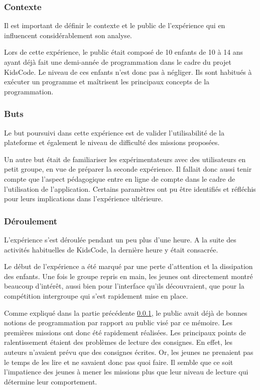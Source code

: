 \subsubsection{Contexte}
\label{context-kidscode}
Il est important de définir le contexte et le public de l'expérience qui en influencent considérablement son analyse.

Lors de cette expérience, le public était composé de 10 enfants de 10 à 14 ans ayant déjà fait une demi-année de programmation dans le cadre du projet KidsCode. Le niveau de ces enfants n'est donc pas à négliger. Ils sont habitués à exécuter un programme et maîtrisent les principaux concepts de la programmation.

\subsubsection{Buts}
Le but poursuivi dans cette expérience est de valider l'utilisabilité de la plateforme et également le niveau de difficulté des \glspl{mission} proposées.

Un autre but était de familiariser les expérimentateurs avec des utilisateurs en petit groupe, en vue de préparer la seconde expérience.
Il fallait donc aussi tenir compte que l'aspect pédagogique entre en ligne de compte dans le cadre de l'utilisation de l'application. Certains paramètres ont pu être identifiés et réfléchis pour leurs implications dans l'expérience ultérieure.

\subsubsection{Déroulement}
L'expérience s'est déroulée pendant un peu plus d'une heure. A la suite des activités habituelles de KidsCode, la dernière heure y était consacrée.

Le début de l'expérience a été marqué par une perte d'attention et la dissipation des enfants. Une fois le groupe repris en main, les jeunes ont directement montré beaucoup d'intérêt, aussi bien pour l'interface qu'ils découvraient, que pour la compétition intergroupe qui s'est rapidement mise en place.

Comme expliqué dans la partie précédente \ref{context-kidscode}, le public avait déjà de bonnes notions de programmation par rapport au public visé par ce mémoire. Les premières \glspl{mission} ont donc été rapidement réalisées. Les principaux points de ralentissement étaient des problèmes de lecture des consignes. En effet, les auteurs n'avaient prévu que des consignes écrites. Or, les jeunes ne prenaient pas le temps de les lire et ne savaient donc pas quoi faire. Il semble que ce soit l'impatience des jeunes à mener les \glspl{mission} plus que leur niveau de lecture qui détermine leur comportement.

